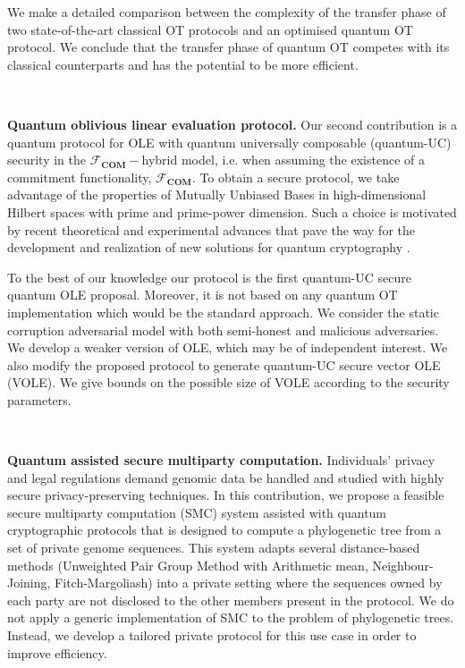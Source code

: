 We make a detailed comparison between the complexity of the transfer phase of two state-of-the-art classical OT protocols \cite{ALSZ13, KOS15} and an optimised quantum OT protocol. We conclude that the transfer phase of quantum OT competes with its classical counterparts and has the potential to be more efficient.

\

\noindent\textbf{Quantum oblivious linear evaluation protocol.} Our second contribution is a quantum protocol for OLE with quantum universally composable (quantum-UC) security in the $\mathcal{F}_{\textbf{COM}}-$hybrid model, i.e. when assuming the existence of a commitment functionality, $\mathcal{F}_{\textbf{COM}}$. To obtain a secure protocol, we take advantage of the properties of Mutually Unbiased Bases in high-dimensional Hilbert spaces with prime and prime-power dimension. Such a choice is motivated by recent theoretical and experimental advances that pave the way for the development and realization of new solutions for quantum cryptography \cite{BPT00,DEBZ10,Zhongetal2015,BHVBFHM18,DHMPPV21}. 

To the best of our knowledge our protocol is the first quantum-UC secure quantum OLE proposal. Moreover, it is not based on any quantum OT implementation which would be the standard approach. %
We consider the static corruption adversarial model with both semi-honest and malicious adversaries. We develop a weaker version of OLE, which may be of independent interest. We also modify the proposed protocol to generate quantum-UC secure vector OLE (VOLE). We give bounds on the possible size of VOLE according to the security parameters.

\

\noindent\textbf{Quantum assisted secure multiparty computation.} Individuals’ privacy and legal regulations demand genomic data be handled and studied with highly secure privacy-preserving techniques. In this contribution, we propose a feasible secure multiparty computation (SMC) system assisted with quantum cryptographic protocols that is designed to compute a phylogenetic tree from a set of private genome sequences. This system adapts several distance-based methods (Unweighted Pair Group Method with Arithmetic mean, Neighbour-Joining, Fitch-Margoliash) into a private setting where the sequences owned by each party are not disclosed to the other members present in the protocol. We do not apply a generic implementation of SMC to the problem of phylogenetic trees. Instead, we develop a tailored private protocol for this use case in order to improve efficiency. 

